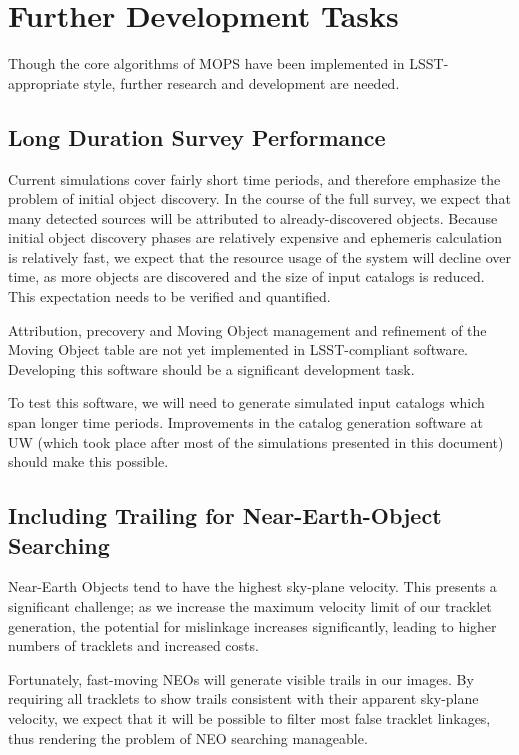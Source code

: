 \section{Further Development Tasks}
\label{furtherDev}

Though the core algorithms of MOPS have been implemented in
LSST-appropriate style, further research and development are needed.


\subsection{Long Duration Survey Performance}

Current simulations cover fairly short time periods, and therefore
emphasize the problem of initial object discovery.  In the course of
the full survey, we expect that many detected sources will be
attributed to already-discovered objects.  Because initial object
discovery phases are relatively expensive and ephemeris calculation is
relatively fast, we expect that the resource usage of the system will
decline over time, as more objects are discovered and the size of
input catalogs is reduced.  This expectation needs to be verified and
quantified.

Attribution, precovery and Moving Object management and refinement of the
Moving Object table are not yet implemented in LSST-compliant software.
Developing this software should be a significant development task.

To test this software, we will need to generate simulated input
catalogs which span longer time periods.  Improvements in the catalog
generation software at UW (which took place after most of the
simulations presented in this document) should make this possible. 

\subsection{Including Trailing for Near-Earth-Object Searching}

\label{neosTrailing}

Near-Earth Objects tend to have the highest sky-plane velocity.  This
presents a significant challenge; as we increase the maximum velocity
limit of our tracklet generation, the potential for mislinkage
increases significantly, leading to higher numbers of tracklets and
increased costs.  

Fortunately, fast-moving NEOs will generate visible trails in our
images.  By requiring all tracklets to show trails consistent with
their apparent sky-plane velocity, we expect that it will be possible
to filter most false tracklet linkages, thus rendering the problem of
NEO searching manageable.

